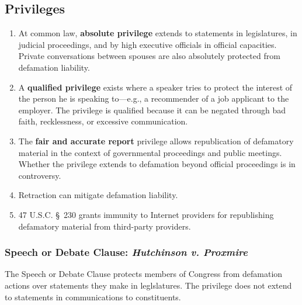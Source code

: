 \subsection{Privileges}

\begin{enumerate}
    \item At common law, \textbf{absolute privilege} extends to statements in 
    legislatures, in judicial proceedings, and by high executive officials in 
    official capacities. Private conversations between spouses are also 
    absolutely protected from defamation liability.
    \item A \textbf{qualified privilege} exists where a speaker tries to 
    protect the interest of the person he is speaking to---e.g., a recommender 
    of a job applicant to the employer. The privilege is qualified because it 
    can be negated through bad faith, recklessness, or excessive 
    communication.
    \item The \textbf{fair and accurate report} privilege allows republication 
    of defamatory material in the context of governmental proceedings and 
    public meetings. Whether the privilege extends to defamation beyond 
    official proceedings is in controversy.
    \item Retraction can mitigate defamation liability.
    \item 47 U.S.C. \S\ 230 grants immunity to Internet providers for 
    republishing defamatory material from third-party providers.
\end{enumerate}

\subsubsection{Speech or Debate Clause: \emph{Hutchinson v. Proxmire}}

The Speech or Debate Clause protects members of Congress from defamation 
actions over statements they make in leglslatures. The privilege does not 
extend to statements in communications to constituents.

